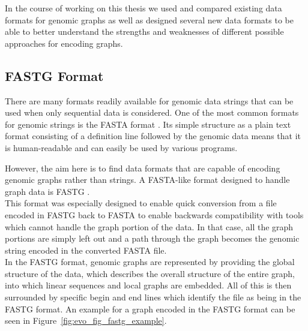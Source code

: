 \documentclass[a4paper,12pt,twoside,BCOR=10mm]{scrbook}
\begin{document}
In the course of working on this thesis we used and compared existing data
formats for genomic graphs as well as designed several new data formats
to be able to better understand the strengths and weaknesses of
different possible approaches for encoding graphs.

\subsection{FASTG Format}

There are many formats readily available for genomic data strings
that can be used when only sequential data is considered.
One of the most common formats for genomic strings is the FASTA format \citep{Childs2007}.
Its simple structure as a plain text format consisting of a definition line
followed by the genomic data means that it is human-readable
and can easily be used by various programs.

However, the aim here is to find data formats that are capable of
encoding genomic graphs rather than strings.
A FASTA-like format designed to handle graph data is FASTG \citep{specFASTG}. \\
This format was especially designed to enable quick conversion from a file
encoded in FASTG back to FASTA to enable backwards compatibility with tools which cannot
handle the graph portion of the data. In that case, all the graph portions are simply left
out and a path through the graph becomes the genomic string encoded in the converted FASTA file. \\
In the FASTG format, genomic graphs are represented by providing the global structure of
the data, which describes the overall structure of the entire graph,
into which linear sequences and local graphs are embedded.
All of this is then surrounded by specific begin and end lines which identify the file as being
in the FASTG format.
An example for a graph encoded in the FASTG format can be seen in Figure~\ref{fig:evo_fig_fastg_example}.
\end{document}
